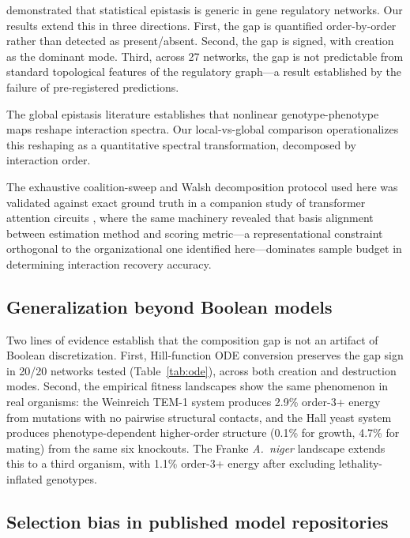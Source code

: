 \documentclass[10pt]{article}
\begin{document}
\citet{gjuvsland2007statistical} demonstrated that
statistical epistasis is generic in gene regulatory networks. Our
results extend this in three directions. First, the gap is quantified
order-by-order rather than detected as present/absent. Second, the
gap is signed, with creation as the dominant mode. Third, across 27
networks, the gap is not predictable from standard topological
features of the regulatory graph---a result established by the
failure of pre-registered predictions.

The global epistasis literature \citep{otwinowski2018inferring, reddy2021global} establishes that nonlinear genotype-phenotype maps
reshape interaction spectra. Our local-vs-global comparison
operationalizes this reshaping as a quantitative spectral
transformation, decomposed by interaction order.

The exhaustive coalition-sweep and Walsh decomposition protocol used
here was validated against exact ground truth in a companion study
of transformer attention circuits \citep{tower2026epistasis}, where the same machinery revealed that basis alignment
between estimation method and scoring metric---a representational
constraint orthogonal to the organizational one identified
here---dominates sample budget in determining interaction recovery
accuracy.


\subsection{Generalization beyond Boolean models}

Two lines of evidence establish that the composition gap is not an
artifact of Boolean discretization. First, Hill-function ODE
conversion preserves the gap sign in 20/20 networks tested
(Table~\ref{tab:ode}), across both creation and destruction modes.
Second, the empirical fitness landscapes show the same phenomenon
in real organisms: the Weinreich TEM-1 system produces 2.9\%
order-3+ energy from mutations with no pairwise structural contacts,
and the Hall yeast system produces phenotype-dependent higher-order
structure (0.1\% for growth, 4.7\% for mating) from the same six
knockouts. The Franke \emph{A.~niger} landscape extends this to a
third organism, with 1.1\% order-3+ energy after excluding
lethality-inflated genotypes.


\subsection{Selection bias in published model repositories}
\end{document}
